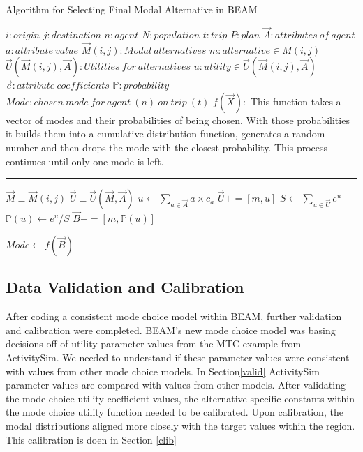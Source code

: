 \documentclass[3p, authoryear, review]{elsarticle} %
\begin{document}
\begin{algorithm}
\caption{Algorithm for Selecting Final Modal Alternative in BEAM}
\begin{algorithmic}[1]
\Require
\State $i : origin$
\State $j : destination$
\State $n: agent$
\State $N: population$
\State $t : trip $
\State $P : plan$
\State $\vec{A}: attributes\:of\:agent$
\State $a: attribute\:value$
\State $\vec{M}(i,j) : Modal\:alternatives$
\State $m : alternative \in M(i,j)$
\State $\vec{U}(\vec{M}(i,j),\vec{A}):Utilities\:for\:alternatives$
\State $u: utility \in \vec{U}(\vec{M}(i,j),\vec{A})$
\State $\vec{c}: attribute\:coefficients$
\State $\mathds{P}: probability$
\State $Mode: chosen\:mode\:for\:agent\:(n)\:on\:trip\:(t)$
\State $f(\vec{X}):$
This function takes a vector of modes and  their probabilities of being chosen. With those probabilities it builds them into a cumulative distribution function, generates a random number and then drops the mode with the closest probability. This process continues until only one mode is left.
\vspace{4pt}\hrule\vspace{5pt}

\State $\vec{M} \equiv \vec{M}(i,j)$
\State $\vec{U} \equiv \vec{U}(\vec{M},\vec{A})$
  \State $u \gets \sum_{a\in \vec{A}} a \times c_a$
  \State $\vec{U} += [m,u]$
\EndFor
\State $S \gets \sum_{u\in \vec{U}}e^u$
    \State $\mathds{P}(u)\gets e^u / S$
    \State $\vec{B} +=[m, \mathds{P}(u)]$
\EndFor 

\State $Mode \gets f(\vec{B})$

\EndProcedure

\EndFor
\EndFor
\Statex
\end{algorithmic}
\end{algorithm}

\hypertarget{mcalib}{%
\subsection{Data Validation and Calibration}\label{mcalib}}

After coding a consistent mode choice model within BEAM, further validation and calibration were completed. BEAM's new mode choice model was basing decisions off of utility parameter values from the MTC example from ActivitySim. We needed to understand if these parameter values were consistent with values from other mode choice models. In Section\ref{valid} ActivitySim parameter values are compared with values from other models. After validating the mode choice utility coefficient values, the alternative specific constants within the mode choice utility function needed to be calibrated. Upon calibration, the modal distributions aligned more closely with the target values within the region. This calibration is doen in Section \ref{clib}
\end{document}
